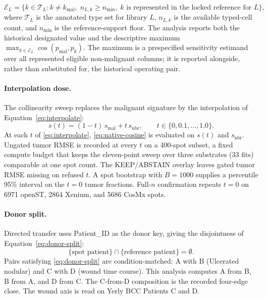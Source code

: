 \begin{equation}
\mathcal E_L=\{k\in\mathcal T_L: k\neq k_{\mathrm{mal}},\; n_{L,k}\ge n_{\min},\; k\text{ is represented in the locked reference for }L\},
\label{eq:eligible-neighbors}
\end{equation}
where \(\mathcal T_L\) is the annotated type set for library \(L\), \(n_{L,k}\) is the available typed-cell count, and \(n_{\min}\) is the reference-support floor. The analysis reports both the historical designated value and the descriptive maximum \(\max_{k\in\mathcal E_L}\cos(p_{\mathrm{mal}},p_k)\). The maximum is a prespecified sensitivity estimand over all represented eligible non-malignant columns; it is reported alongside, rather than substituted for, the historical operating pair.

\paragraph{Interpolation dose.}
The collinearity sweep replaces the malignant signature by the interpolation of Equation~\eqref{eq:interpolate}:
\begin{equation}
s(t)=(1-t)\,s_{\mathrm{mal}}+t\,s_{\mathrm{nbr}},\qquad t\in\{0,0.1,\ldots,1.0\}.
\label{eq:interpolate}
\end{equation}
At each \(t\) of \eqref{eq:interpolate}, \eqref{eq:native-cosine} is evaluated on \(s(t)\) and \(s_{\mathrm{nbr}}\). Ungated tumor RMSE is recorded at every \(t\) on a 400-spot subset, a fixed compute budget that keeps the eleven-point sweep over three substrates (33 fits) comparable at one spot count. The KEEP/ABSTAIN overlay leaves gated tumor RMSE missing on refused \(t\). A spot bootstrap with \(B=1000\) supplies a percentile 95\% interval on the \(t=0\) tumor fractions. Full-\(n\) confirmation repeats \(t=0\) on 6971 openST, 2864 Xenium, and 5686 CosMx spots.

\paragraph{Donor split.}
Directed transfer uses Patient\_ID as the donor key, giving the disjointness of Equation~\eqref{eq:donor-split}:
\begin{equation}
\{\text{spot patient}\}\cap\{\text{reference patient}\}=\emptyset.
\label{eq:donor-split}
\end{equation}
Pairs satisfying \eqref{eq:donor-split} are condition-matched: A with B (Ulcerated nodular) and C with D (wound time course). This analysis computes A from B, B from A, and D from C. The C-from-D composition is the recorded four-edge close. The wound axis is read on Yerly BCC Patients C and D.

